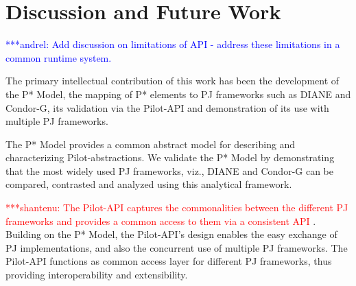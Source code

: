 \documentclass[conference,final]{IEEEtran}
\newcommand{\jhanote}[1]{ {\textcolor{red} { ***shantenu: #1 }}}
\newcommand{\alnote}[1]{ {\textcolor{blue} { ***andrel: #1 }}}
\newcommand{\alnote}[1]{}
\newcommand{\jhanote}[1]{}
\newcommand{\upp}{\vspace*{-0.5em}}
\begin{document}
% 
% 



\section{Discussion and Future Work \upp\upp}
\label{sec:discussion-future-work}



\alnote{Add discussion on limitations of API - address these
  limitations in a common runtime system.}

The primary intellectual contribution of this work has been the
development of the P* Model, the mapping of P* elements to PJ
frameworks such as DIANE and Condor-G, its validation via the
Pilot-API and demonstration of its use with multiple PJ frameworks.
 
The P* Model provides a common abstract model for describing and
characterizing Pilot-abstractions. We validate the P* Model by
demonstrating that the most widely used PJ frameworks, viz., DIANE and
Condor-G can be compared, contrasted and analyzed using this
analytical framework.


\jhanote{The Pilot-API captures the commonalities between the
  different PJ frameworks and provides a common access to them via a
  consistent API}.  Building on the P* Model, the Pilot-API's design
enables the easy exchange of PJ implementations, and also the
concurrent use of multiple PJ frameworks. The Pilot-API functions as
common access layer for different PJ frameworks, thus providing
interoperability and extensibility.
\end{document}
